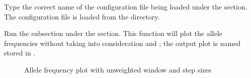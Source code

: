 \documentclass[letterpaper,10pt,english]{sphinxhowto}
\begin{document}
\sphinxAtStartPar
Type the correct name of the configuration file being loaded under the  section. The configuration file  is loaded from the  directory.

\begin{sphinxVerbatim}[commandchars=\\\{\}]
 \PYG{p}{[} \PYG{p}{]}   
\end{sphinxVerbatim}

\sphinxAtStartPar
Run the  subsection under the  section. This function will plot the allele frequencies without taking into consideration  and ; the output plot is named  stored in .

\begin{sphinxVerbatim}[commandchars=\\\{\}]
 \PYG{p}{[} \PYG{p}{]} 
\end{sphinxVerbatim}

\begin{figure}[htbp]
\centering
\capstart

\noindent{}
\caption{Allele frequency plot with unweighted window and step sizes}\label{\detokenize{index:id1}}\end{figure}
\end{document}
